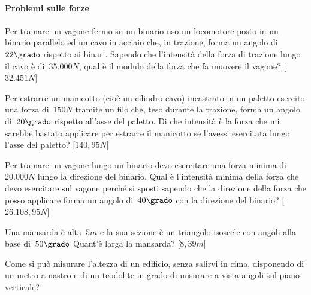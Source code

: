 \paragraph{Problemi sulle forze}

\begin{multicols}{2}
 \begin{esercizio}[\Ast]
\label{ese:G.51}
Per trainare un vagone fermo su un binario uso un locomotore posto in un binario 
parallelo ed un cavo in acciaio che, in trazione,
forma un angolo di~$22\grado$ rispetto ai binari. Sapendo che l'intensità della 
forza di trazione lungo il cavo è di~$35.000\unit{N}$,
qual è il modulo della forza che fa muovere il vagone?
\hfill [$32.451\unit{N}$]
\end{esercizio}

\begin{esercizio}[\Ast]
\label{ese:G.52}
Per estrarre un manicotto (cioè un cilindro cavo) incastrato in un paletto 
esercito una forza di~$150\unit{N}$ tramite un filo che,
teso durante la trazione, forma un angolo di~$20\grado$ rispetto all'asse del 
paletto. Di che intensità è la forza che mi sarebbe
bastato applicare per estrarre il manicotto se l'avessi esercitata lungo l'asse 
del paletto?
\hfill [$140,95\unit{N}$]
\end{esercizio}

\begin{esercizio}[\Ast]
\label{ese:G.53}
Per trainare un vagone lungo un binario devo esercitare una forza minima 
di~$20.000\unit{N}$ lungo la direzione del binario.
Qual è l'intensità minima della forza che devo esercitare sul vagone perché si 
sposti sapendo che la direzione della forza che posso
applicare forma un angolo di~$40\grado$ con la direzione del binario?
\hfill [$26.108,95\unit{N}$]
\end{esercizio}

\begin{esercizio}[\Ast]
\label{ese:G.54}
Una mansarda è alta~$5\unit{m}$ e la sua sezione è un triangolo isoscele con 
angoli alla base di~$50\grado$ Quant'è larga la mansarda?
\hfill [$8,39\unit{m}$]
\end{esercizio}

\begin{esercizio}
\label{ese:G.55}
Come si può misurare l'altezza di un edificio, senza salirvi in cima, disponendo 
di un metro a nastro e di un teodolite in grado di
misurare a vista angoli sul piano verticale?
\end{esercizio}


\end{multicols}
